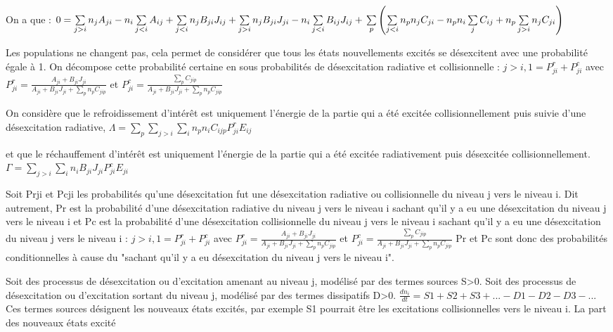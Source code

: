\documentclass[10pt, a4paper]{report}
\numberwithin{equation}{subsection}
\begin{document}
On a que : $0=\sum\limits_{j>i} n_jA_{ji}-n_i\sum\limits_{j<i} A_{ij}+\sum\limits_{j<i} n_jB_{ji}J_{ij}+\sum\limits_{j>i} n_jB_{ji}J_{ji}-n_i\sum\limits_{j<i}B_{ij}J_{ij}+\\
\sum\limits_p\left(\sum\limits_{j<i}n_p n_j C_{ji}-n_pn_i\sum\limits_j C_{ij}+n_p\sum\limits_{j>i}n_j C_{ji}\right)$

Les populations ne changent pas, cela permet de considérer que tous les états nouvellements excités se désexcitent avec une probabilité égale à 1. On décompose cette probabilité certaine en sous probabilités de désexcitation radiative et collisionnelle :
$j>i, 1=P_{ji}^r+P_{ji}^c$ avec $P_{ji}^r= \frac{A_{ji}+B_{ji} J_{ji}}{A_{ji}+B_{ji} J_{ji}+\sum\limits_p n_p C_{jip}}$ et $P_{ji}^c= \frac{\sum\limits_p C_{jip}}{A_{ji}+B_{ji} J_{ji}+\sum\limits_p n_p C_{jip}}$

On considère que le refroidissement d'intérêt est uniquement l'énergie de la partie qui a été excitée collisionnellement puis suivie d'une désexcitation radiative,
 $\Lambda = \sum\limits_p\sum\limits_{j>i}\sum\limits_i n_p n_i C_{ijp} P_{ji}^r E_{ij}$

et que le réchauffement d'intérêt est uniquement l'énergie de la partie qui a été excitée radiativement puis désexcitée collisionnellement.
 $\Gamma = \sum\limits_{j>i}\sum\limits_i n_i B_{ji} J_{ji} P_{ji}^c E_{ji}$


Soit Prji et Pcji les probabilités qu'une désexcitation fut une désexcitation radiative ou collisionnelle du niveau j vers le niveau i. Dit autrement, Pr est la probabilité d'une désexcitation radiative du niveau j vers le niveau i sachant qu'il y a eu une désexcitation du niveau j vers le niveau i et Pc est la probabilité d'une désexcitation collisionnelle du niveau j vers le niveau i sachant qu'il y a eu une désexcitation du niveau j vers le niveau i :
$j>i, 1=P_{ji}^r+P_{ji}^c$ avec $P_{ji}^r= \frac{A_{ji}+B_{ji} J_{ji}}{A_{ji}+B_{ji} J_{ji}+\sum\limits_p n_p C_{jip}}$ et $P_{ji}^c= \frac{\sum\limits_p C_{jip}}{A_{ji}+B_{ji} J_{ji}+\sum\limits_p n_p C_{jip}}$
Pr et Pc sont donc des probabilités conditionnelles à cause du "sachant qu'il y a eu désexcitation du niveau j vers le niveau i".

Soit des processus de désexcitation ou d'excitation amenant au niveau j, modélisé par des termes sources S>0.
Soit des processus de désexcitation ou d'excitation sortant du niveau j, modélisé par des termes dissipatifs D>0.
 $\frac{dn_i}{dt}= S1+S2+S3+...-D1-D2-D3-...$
Ces termes sources désignent les nouveaux états excités, par exemple S1 pourrait être les excitations collisionnelles vers le niveau i.
La part des nouveaux états excité 
\end{document}
